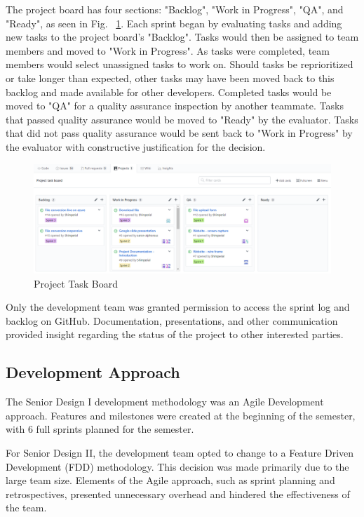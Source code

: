 The project board has four sections: "Backlog", "Work in Progress", "QA", and "Ready", as seen in Fig. 
~\ref{fig:ProjectTaskBoard}. Each sprint began by evaluating tasks and adding new tasks to the project board's "Backlog". Tasks would then be assigned to team members and moved to "Work in Progress". As tasks were completed, team members would select unassigned tasks to work on. Should tasks be reprioritized or take longer than expected, other tasks may have been moved back to this backlog and made available for other developers. Completed tasks would be moved to "QA" for a quality assurance inspection by another teammate. Tasks that passed quality assurance would be moved to "Ready" by the evaluator. Tasks that did not pass quality assurance would be sent back to "Work in Progress" by the evaluator with constructive justification for the decision. 

\begin{figure}[H]
    \centering
    \includegraphics[width=\textwidth]{ProjectTaskBoard.png}
    \caption{Project Task Board}
    \label{fig:ProjectTaskBoard}
\end{figure}

Only the development team was granted permission to access the sprint log and backlog on GitHub. Documentation, presentations, and other communication provided insight regarding the status of the project to other interested parties. 

\subsection{Development Approach}
The Senior Design I development methodology was an Agile Development approach. Features and milestones were created at the beginning of the semester, with 6 full sprints planned for the semester.

For Senior Design II, the development team opted to change to a Feature Driven Development (FDD) methodology. This decision was made primarily due to the large team size. Elements of the Agile approach, such as sprint planning and retrospectives, presented unnecessary overhead and hindered the effectiveness of the team.


